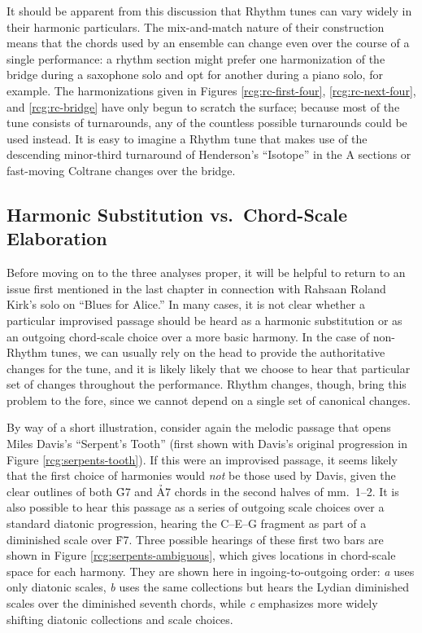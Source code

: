 It should be apparent from this discussion that Rhythm tunes can vary widely
in their harmonic particulars. The mix-and-match nature of their construction
means that the chords used by an ensemble can change even over the course of a
single performance: a rhythm section might prefer one harmonization of the
bridge during a saxophone solo and opt for another during a piano solo, for
example. The harmonizations given in Figures \ref{rcg:rc-first-four},
\ref{rcg:rc-next-four}, and \ref{rcg:rc-bridge} have only begun to scratch the
surface; because most of the tune consists of turnarounds, any of the
countless possible turnarounds could be used instead. It is easy to
imagine a Rhythm tune that makes use of the descending minor-third turnaround
of Henderson's ``Isotope'' in the A sections or fast-moving Coltrane changes
over the bridge.

\subsection{Harmonic Substitution vs.\ Chord-Scale Elaboration}

Before moving on to the three analyses proper, it will be helpful to return to
an issue first mentioned in the last chapter in connection with Rahsaan Roland
Kirk's solo on ``Blues for Alice.'' In many cases, it is not clear whether a
particular improvised passage should be heard as a harmonic substitution or as
an outgoing chord-scale choice over a more basic harmony. In the case of
non-Rhythm tunes, we can usually rely on the head to provide the authoritative
changes for the tune, and it is likely likely that we choose to hear that
particular set of changes throughout the performance. Rhythm changes, though,
bring this problem to the fore, since we cannot depend on a single set of
canonical changes.

By way of a short illustration, consider again the melodic passage that opens
Miles Davis's ``Serpent's Tooth'' (first shown with Davis's original
progression in Figure \ref{rcg:serpents-tooth}). If this were an improvised
passage, it seems likely that the first choice of harmonies would \emph{not}
be those used by Davis, given the clear outlines of both \h{G7} and \h{A7}
chords in the second halves of mm.~1--2. It is also possible to hear this
passage as a series of outgoing scale choices over a standard diatonic
progression, hearing the C\sharp--E--G fragment as part of a diminished scale
over \h{F7}. Three possible hearings of these first two bars are
shown in Figure \ref{rcg:serpents-ambiguous}, which gives locations in
chord-scale space for each harmony. They are shown here in ingoing-to-outgoing
order: \emph{a} uses only diatonic scales, \emph{b} uses the same collections
but hears the Lydian diminished scales over the diminished seventh chords,
while \emph{c} emphasizes more widely shifting diatonic collections and scale
choices.

